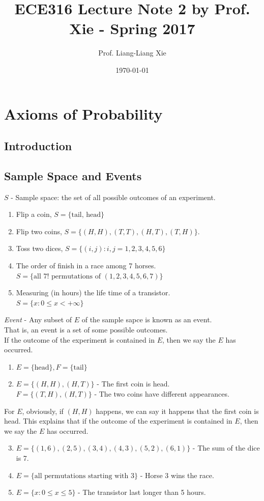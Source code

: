 \documentclass[11pt, letterpaper]{article}
\title{ECE316 Lecture Note 2 by Prof. Xie - Spring 2017}
\author{Prof. Liang-Liang Xie}
\date{\today}
\begin{document}
\setcounter{section}{1}
\section{Axioms of Probability}
\subsection{Introduction}
\subsection{Sample Space and Events}
$\mathit{S}$ - Sample space: the set of all possible outcomes of an experiment. \\
\begin{enumerate}
  \item Flip a coin, $S = \{ \text{tail,  head} \}$
  \item Flip two coins, $S = \{(H,H), (T,T), (H,T), (T,H)\}$.
  \item Toss two dices, $S = \{(i,j): i,j=1,2,3,4,5,6\}$
  \item The order of finish in a race among 7 horses. \\ $S = \{ \text{all } 7! \text{ permutations of } (1,2,3,4,5,6,7) \}$
  \item Measuring (in hours) the life time of a transistor. \\ $S = \{x:0 \le x < +\infty \}$
\end{enumerate}
\vspace{1.0cm}
\textit{Event} - Any subset of $E$ of the sample sapce is known as an event. \\ That is, an event is a set of some possible outcomes. \\ If the outcome of the experiment is contained in $E$, then we say the $E$ has occurred.
\begin{enumerate}
  \item $E = \{\text{head}\}, F = \{\text{tail}\}$
  \item $E = \{(H,H), (H,T)\}$ - The first coin is head. \\ $F = \{(T,H), (H,T)\}$ - The two coins have different appearances.
\end{enumerate}
For $E$, obviously, if $(H,H)$ happens, we can say it happens that the first coin is head. This explains that if the outcome of the experiment is contained in $E$, then we say the $E$ has occurred.
\begin{enumerate}
  \setcounter{enumi}{2}
  \item $E = \{(1,6), (2,5), (3,4), (4,3), (5,2), (6,1)\}$ - The sum of the dice is 7.
  \item $E = \{\text{all permutations starting with 3}\}$ - Horse 3 wins the race.
  \item $E = \{x:0 \le x \le 5\}$ - The transistor last longer than 5 hours.
\end{enumerate}
\end{document}
